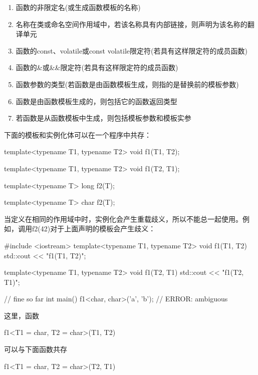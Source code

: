 \begin{enumerate}
\item 
函数的非限定名(或生成函数模板的名称)

\item 
名称在类或命名空间作用域中，若该名称具有内部链接，则声明为该名称的翻译单元

\item 
函数的const、volatile或const volatile限定符(若具有这样限定符的成员函数)

\item 
函数的\&或\&\&限定符(若具有这样限定符的成员函数)

\item 
函数参数的类型(若函数是由函数模板生成，则指的是替换前的模板参数)

\item 
函数是由函数模板生成的，则包括它的函数返回类型

\item 
若函数是从函数模板中生成，则包括模板参数和模板实参
\end{enumerate}

下面的模板和实例化体可以在一个程序中共存：

\begin{cpp}
template<typename T1, typename T2>
void f1(T1, T2);

template<typename T1, typename T2>
void f1(T2, T1);

template<typename T>
long f2(T);

template<typename T>
char f2(T);
\end{cpp}

当定义在相同的作用域中时，实例化会产生重载歧义，所以不能总一起使用。例如，调用f2(42)对于上面声明的模板会产生歧义：

\begin{cpp}
#include <iostream>
template<typename T1, typename T2>
void f1(T1, T2)
{
	std::cout << "f1(T1, T2)\n";
}

template<typename T1, typename T2>
void f1(T2, T1)
{
	std::cout << "f1(T2, T1)\n";
}

// fine so far
int main()
{
	f1<char, char>(’a’, ’b’); // ERROR: ambiguous
}
\end{cpp}

这里，函数

\begin{cpp}
f1<T1 = char, T2 = char>(T1, T2)
\end{cpp}

可以与下面函数共存

\begin{cpp}
f1<T1 = char, T2 = char>(T2, T1)
\end{cpp}

